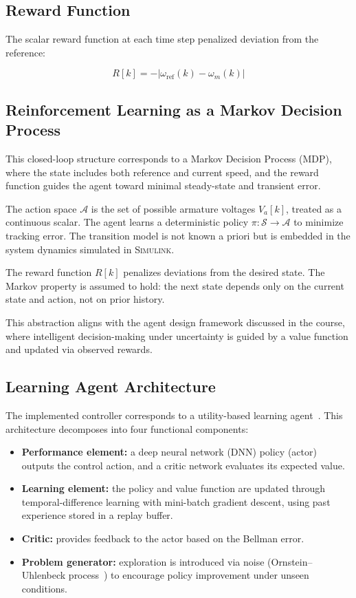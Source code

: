 \subsection{Reward Function}

The scalar reward function at each time step penalized deviation from the reference:

\begin{equation}
    R[k] = -|\omega_{\text{ref}}(k) - \omega_m(k)|
\end{equation}

\subsection{Reinforcement Learning as a Markov Decision Process}

This closed-loop structure corresponds to a Markov Decision Process (MDP), where the state includes both reference and current speed, and the reward function guides the agent toward minimal steady-state and transient error.

The action space $\mathcal{A}$ is the set of possible armature voltages $V_a[k]$, treated as a continuous scalar. The agent learns a deterministic policy $\pi: \mathcal{S} \to \mathcal{A}$ to minimize tracking error. The transition model is not known a priori but is embedded in the system dynamics simulated in \textsc{Simulink}.

The reward function $R[k]$ penalizes deviations from the desired state. The Markov property is assumed to hold: the next state depends only on the current state and action, not on prior history.

This abstraction aligns with the agent design framework discussed in the course, where intelligent decision-making under uncertainty is guided by a value function and updated via observed rewards.

\subsection{Learning Agent Architecture}

The implemented controller corresponds to a utility-based learning agent~\cite{Lillicrap2019}. This architecture decomposes into four functional components:

\begin{itemize}
    \item \textbf{Performance element:} a deep neural network (DNN) policy (actor) outputs the control action, and a critic network evaluates its expected value.
    \item \textbf{Learning element:} the policy and value function are updated through \linebreak temporal-difference learning with mini-batch gradient descent, using past experience stored in a replay buffer.
    \item \textbf{Critic:} provides feedback to the actor based on the Bellman error.
    \item \textbf{Problem generator:} exploration is introduced via noise (Ornstein–Uhlenbeck process~\cite{Uhlenbeck1930}) to encourage policy improvement under unseen conditions.
\end{itemize}

